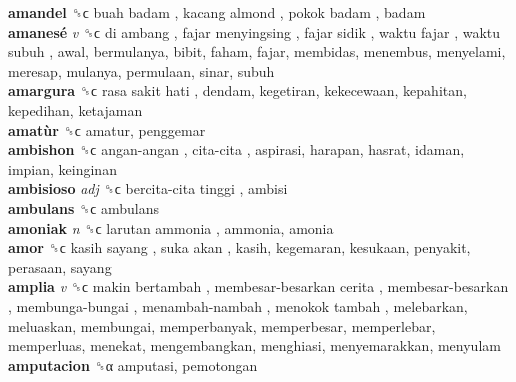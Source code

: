 \textbf{amandel} ␝ϲ   buah badam ,  kacang almond ,  pokok badam , badam  \\
\textbf{amanesé} \emph{v}  ␝ϲ   di ambang ,  fajar menyingsing ,  fajar sidik ,  waktu fajar ,  waktu subuh , awal, bermulanya, bibit, faham, fajar, membidas, menembus, menyelami, meresap, mulanya, permulaan, sinar, subuh  \\
\textbf{amargura} ␝ϲ   rasa sakit hati , dendam, kegetiran, kekecewaan, kepahitan, kepedihan, ketajaman  \\
\textbf{amatùr} ␝ϲ  amatur, penggemar  \\
\textbf{ambishon} ␝ϲ   angan-angan ,  cita-cita , aspirasi, harapan, hasrat, idaman, impian, keinginan  \\
\textbf{ambisioso} \emph{adj}  ␝ϲ   bercita-cita tinggi , ambisi  \\
\textbf{ambulans} ␝ϲ  ambulans  \\
\textbf{amoniak} \emph{n}  ␝ϲ   larutan ammonia , ammonia, amonia  \\
\textbf{amor} ␝ϲ   kasih sayang ,  suka akan , kasih, kegemaran, kesukaan, penyakit, perasaan, sayang  \\
\textbf{amplia} \emph{v}  ␝ϲ   makin bertambah ,  membesar-besarkan cerita ,  membesar-besarkan ,  membunga-bungai ,  menambah-nambah ,  menokok tambah , melebarkan, meluaskan, membungai, memperbanyak, memperbesar, memperlebar, memperluas, menekat, mengembangkan, menghiasi, menyemarakkan, menyulam  \\
\textbf{amputacion} ␝α  amputasi, pemotongan  \\
